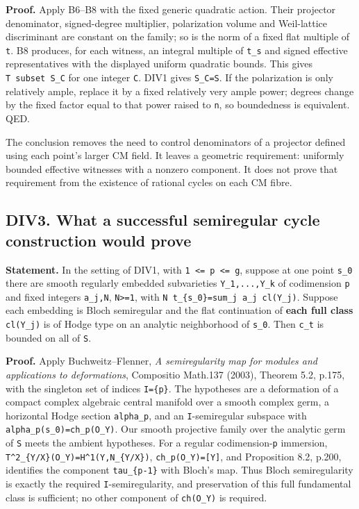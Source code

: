 \documentclass[11pt,a4paper]{article}
\theoremstyle{definition}
\begin{document}
\textbf{Proof.} Apply B6--B8 with the fixed generic quadratic action.
Their projector denominator, signed-degree multiplier, polarization
volume and Weil-lattice discriminant are constant on the family; so is
the norm of a fixed flat multiple of \texttt{t}. B8 produces, for each
witness, an integral multiple of \texttt{t\_s} and signed effective
representatives with the displayed uniform quadratic bounds. This gives
\texttt{T\ subset\ S\_C} for one integer \texttt{C}. DIV1 gives
\texttt{S\_C=S}. If the polarization is only relatively ample, replace
it by a fixed relatively very ample power; degrees change by the fixed
factor equal to that power raised to \texttt{n}, so boundedness is
equivalent. QED.

The conclusion removes the need to control denominators of a projector
defined using each point's larger CM field. It leaves a geometric
requirement: uniformly bounded effective witnesses with a nonzero
component. It does not prove that requirement from the existence of
rational cycles on each CM fibre.

\subsection{DIV3. What a successful semiregular cycle construction would
prove}\label{bounded-division-div3.-what-a-successful-semiregular-cycle-construction-would-prove}

\textbf{Statement.} In the setting of DIV1, with
\texttt{1\ \textless{}=\ p\ \textless{}=\ g}, suppose at one point
\texttt{s\_0} there are smooth regularly embedded subvarieties
\texttt{Y\_1,...,Y\_k} of codimension \texttt{p} and fixed integers
\texttt{a\_j,N}, \texttt{N\textgreater{}=1}, with
\texttt{N\ t\_\{s\_0\}=sum\_j\ a\_j\ cl(Y\_j)}. Suppose each embedding
is Bloch semiregular and the flat continuation of \textbf{each full
class} \texttt{cl(Y\_j)} is of Hodge type on an analytic neighborhood of
\texttt{s\_0}. Then \texttt{c\_t} is bounded on all of \texttt{S}.

\textbf{Proof.} Apply Buchweitz--Flenner, \emph{A semiregularity map for
modules and applications to deformations}, Compositio Math.137 (2003),
Theorem 5.2, p.175, with the singleton set of indices \texttt{I=\{p\}}.
The hypotheses are a deformation of a compact complex algebraic central
manifold over a smooth complex germ, a horizontal Hodge section
\texttt{alpha\_p}, and an \texttt{I}-semiregular subspace with
\texttt{alpha\_p(s\_0)=ch\_p(O\_Y)}. Our smooth projective family over
the analytic germ of \texttt{S} meets the ambient hypotheses. For a
regular codimension-\texttt{p} immersion,
\texttt{T\^{}2\_\{Y/X\}(O\_Y)=H\^{}1(Y,N\_\{Y/X\})},
\texttt{ch\_p(O\_Y)={[}Y{]}}, and Proposition 8.2, p.200, identifies the
component \texttt{tau\_\{p-1\}} with Bloch's map. Thus Bloch
semiregularity is exactly the required \texttt{I}-semiregularity, and
preservation of this full fundamental class is sufficient; no other
component of \texttt{ch(O\_Y)} is required.
\end{document}
